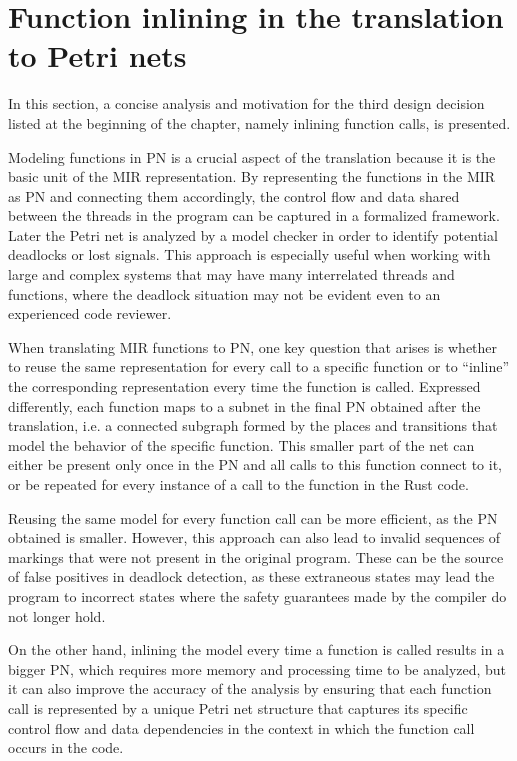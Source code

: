 \documentclass[../Thesis.tex]{subfiles}
\begin{document}
\section{Function inlining in the translation to Petri nets}

In this section, a concise analysis and motivation for the third design decision
listed at the beginning of the chapter, namely inlining function calls, is presented.

Modeling functions in \acrshort{PN} is a crucial aspect of the translation
because it is the basic unit of the MIR representation.
By representing the functions in the MIR as \acrshort{PN} and connecting them accordingly,
the control flow and data shared between the threads in the program
can be captured in a formalized framework.
Later the Petri net is analyzed by a model checker
in order to identify potential deadlocks or lost signals.
This approach is especially useful when working with large and complex systems
that may have many interrelated threads and functions,
where the deadlock situation may not be evident even to an experienced code reviewer.

When translating MIR functions to \acrshort{PN}, one key question that arises is
whether to reuse the same representation for every call to a specific function or
to ``inline'' the corresponding representation every time the function is called.
Expressed differently, each function maps to a subnet
in the final \acrshort{PN} obtained after the translation, i.e.
a connected subgraph formed by the places and transitions
that model the behavior of the specific function.
This smaller part of the net can either be present only once in the \acrshort{PN}
and all calls to this function connect to it,
or be repeated for every instance of a call to the function in the Rust code.

Reusing the same model for every function call can be more efficient,
as the \acrshort{PN} obtained is smaller.
However, this approach can also lead to invalid sequences of markings
that were not present in the original program.
These can be the source of false positives in deadlock detection,
as these extraneous states may lead the program to
incorrect states where the safety guarantees made by the compiler do not longer hold.

On the other hand, inlining the model every time a function is called results in
a bigger \acrshort{PN}, which requires more memory and processing time to be analyzed,
but it can also improve the accuracy of the analysis by ensuring
that each function call is represented by a unique Petri net structure
that captures its specific control flow and data dependencies in the context
in which the function call occurs in the code.
\end{document}
